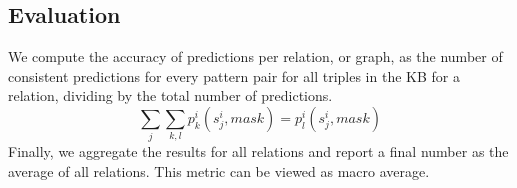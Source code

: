 \subsection{Evaluation}
\label{sec:eval}



We compute the accuracy of predictions per relation, or graph, as the number of consistent predictions for every pattern pair for all triples in the KB for a relation, dividing by the total number of predictions.
\[
\sum_j \sum_{k,l} p_k^i(s_j^i,mask) = p_l^i(s_j^i,mask)
\]
Finally, we aggregate the results for all relations and report a final number as the average of all relations. This metric can be viewed as macro average.

